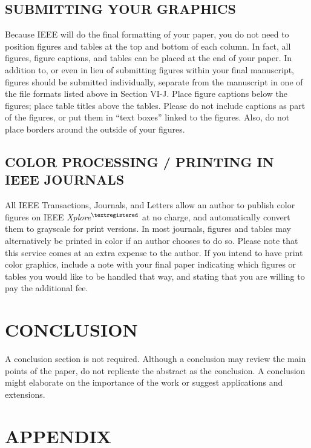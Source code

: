 \documentclass{IEEEjmw}
\begin{document}

\subsection{SUBMITTING YOUR GRAPHICS}

Because IEEE will do the final formatting of your paper, you do not need to position figures and tables at the top and bottom of each column. In fact, all figures, figure captions, and tables can be placed at the end of your paper. In addition to, or even in lieu of submitting figures within your final manuscript, figures should be submitted individually, separate from the manuscript in one of the file formats listed above in Section VI-J. Place figure captions below the figures; place table titles above the tables. Please do not include captions as part of the figures, or put them in ``text boxes'' linked to the figures. Also, do not place borders around the outside of your figures.


\subsection{COLOR PROCESSING / PRINTING IN IEEE JOURNALS}

All IEEE Transactions, Journals, and Letters allow an author to publish color figures on IEEE {\it Xplore}$^{\scriptsize\textregistered}$ at no charge, and automatically convert them to grayscale for print versions. In most journals, figures and tables may alternatively be printed in color if an author chooses to do so. Please note that this service comes at an extra expense to the author. If you intend to have print color graphics, include a note with your final paper indicating which figures or tables you would like to be handled that way, and stating that you are willing to pay the additional fee.

\section{CONCLUSION}

A conclusion section is not required. Although a conclusion may review the main points of the paper, do not replicate the abstract as the conclusion. A conclusion might elaborate on the importance of the work or suggest applications and extensions.

\section*{APPENDIX}
\end{document}
